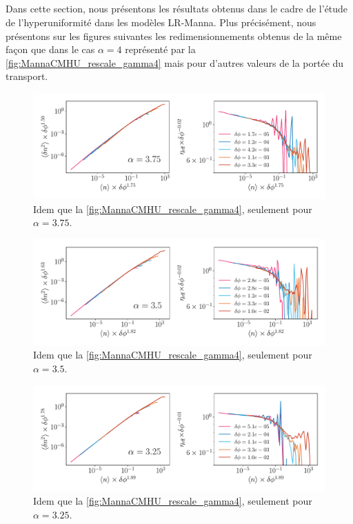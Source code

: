 \label{sec:mesures_HU_Manna}

\subparagraph{}Dans cette section, nous présentons les résultats obtenus dans le cadre de l'étude de l'hyperuniformité dans les modèles LR-Manna. Plus précisément, nous présentons sur les figures suivantes les redimensionnements obtenus de la même façon que dans le cas $\alpha=4$ représenté par la \autoref{fig:MannaCMHU_rescale_gamma4} mais pour d'autres valeurs de la portée du transport.

\begin{figure}[H]
	\centering
	\includegraphics[width=\textwidth]{Chapitre2/Figures/Hyperuniformity/RescaleHU_MannaCM_Gamma375.pdf}
	\caption{Idem que la \autoref{fig:MannaCMHU_rescale_gamma4}, seulement pour $\alpha=3.75$.}
	\label{fig:MannaCMHU_rescale_gamma375}
\end{figure}

\begin{figure}[H]
	\centering
	\includegraphics[width=\textwidth]{Chapitre2/Figures/Hyperuniformity/RescaleHU_MannaCM_Gamma35.pdf}
	\caption{Idem que la \autoref{fig:MannaCMHU_rescale_gamma4}, seulement pour $\alpha=3.5$.}
	\label{fig:MannaCMHU_rescale_gamma35}
\end{figure}

\begin{figure}[H]
	\centering
	\includegraphics[width=\textwidth]{Chapitre2/Figures/Hyperuniformity/RescaleHU_MannaCM_Gamma325.pdf}
	\caption{Idem que la \autoref{fig:MannaCMHU_rescale_gamma4}, seulement pour $\alpha=3.25$.}
	\label{fig:MannaCMHU_rescale_gamma325}
\end{figure}

